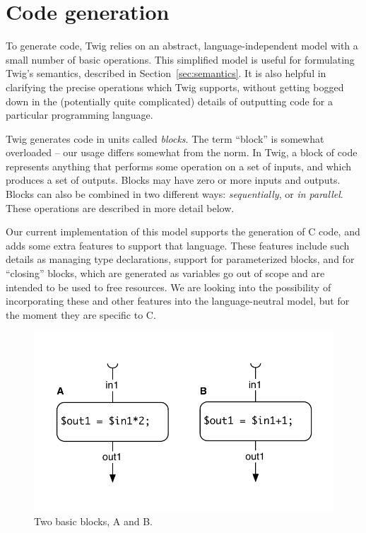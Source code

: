 
\section{Code generation}
\label{sec:code-gen}

To generate code, Twig relies on an abstract, language-independent model with a
small number of basic operations. This simplified model is useful for
formulating Twig's semantics, described in Section~\ref{sec:semantics}. It is
also helpful in clarifying the precise operations which Twig supports, without
getting bogged down in the (potentially quite complicated) details of outputting
code for a particular programming language.

Twig generates code in units called \emph{blocks}. The term ``block'' is
somewhat overloaded -- our usage differs somewhat from the norm. In Twig, a
block of code represents anything that performs some operation on a set of
inputs, and which produces a set of outputs. Blocks may have zero or more inputs
and outputs. Blocks can also be combined in two different ways:
\emph{sequentially}, or \emph{in parallel}. These operations are described in
more detail below.

Our current implementation of this model supports the generation of C code, and
adds some extra features to support that language. These features include such
details as managing type declarations, support for parameterized blocks, and for
``closing'' blocks, which are generated as variables go out of scope and are
intended to be used to free resources. We are looking into the possibility of
incorporating these and other features into the language-neutral model, but for
the moment they are specific to C.

\begin{figure}[ht]
\centering
\includegraphics[width=0.75\columnwidth]{images/code-gen1}
\caption{Two basic blocks, A and B.}
\label{fig:codegen-blocks}
\end{figure}

